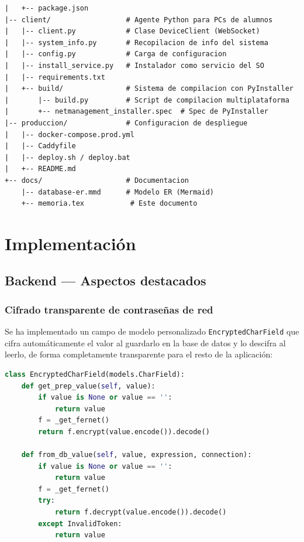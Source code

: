 \documentclass[12pt, a4paper, twoside]{article}
\begin{document}
\begin{lstlisting}[language={}, caption={Estructura de directorios del proyecto.}]
|   +-- package.json
|-- client/                  # Agente Python para PCs de alumnos
|   |-- client.py            # Clase DeviceClient (WebSocket)
|   |-- system_info.py       # Recopilacion de info del sistema
|   |-- config.py            # Carga de configuracion
|   |-- install_service.py   # Instalador como servicio del SO
|   |-- requirements.txt
|   +-- build/               # Sistema de compilacion con PyInstaller
|       |-- build.py         # Script de compilacion multiplataforma
|       +-- netmanagement_installer.spec  # Spec de PyInstaller
|-- produccion/              # Configuracion de despliegue
|   |-- docker-compose.prod.yml
|   |-- Caddyfile
|   |-- deploy.sh / deploy.bat
|   +-- README.md
+-- docs/                    # Documentacion
    |-- database-er.mmd      # Modelo ER (Mermaid)
    +-- memoria.tex           # Este documento
\end{lstlisting}

\section{Implementación}

\subsection{Backend — Aspectos destacados}

\subsubsection{Cifrado transparente de contraseñas de red}

Se ha implementado un campo de modelo personalizado \texttt{EncryptedCharField} que cifra automáticamente el valor al guardarlo en la base de datos y lo descifra al leerlo, de forma completamente transparente para el resto de la aplicación:

\begin{lstlisting}[language=Python, caption={Campo cifrado con Fernet (fields.py).}]
class EncryptedCharField(models.CharField):
    def get_prep_value(self, value):
        if value is None or value == '':
            return value
        f = _get_fernet()
        return f.encrypt(value.encode()).decode()

    def from_db_value(self, value, expression, connection):
        if value is None or value == '':
            return value
        f = _get_fernet()
        try:
            return f.decrypt(value.encode()).decode()
        except InvalidToken:
            return value
\end{lstlisting}
\end{document}
